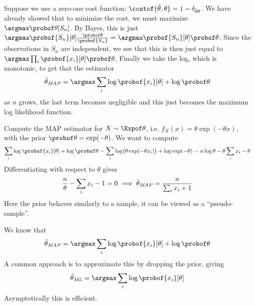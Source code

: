 \eexam

\bexam[title=Maximum Aposteriori]

    Suppose we use a {\emphcolor zero-one} cost function: $\costof{\hat\theta,\theta}=1-\delta_{\hat\theta\theta}$.
    We have already showed that to minimize the cost, we must maximize $\argmax\probof\theta[S_n]$.
    By Bayes, this is just $\argmax\probof{S_n}[\theta]\frac{\probof\theta}{\probof{S_n}}=\argmax\probof{S_n}[\theta]\probof\theta$.
    Since the observations in $S_n$ are independent, we see that this is then just equal to $\argmax\prod_i\probof{x_i}[\theta]\probof\theta$.
    Finally we take the log, which is monotonic, to get that the estimator
    $$ \hat\theta_{\it MAP} = \argmax\sum_i\log\probof{x_i}[\theta] + \log\probof\theta $$
    as $n$ grows, the last term becomes negligible and this just becomes the maximum log likelihood function.

\eexam

\bexerc

    Compute the MAP estimator for $X\sim\Expof\theta$, i.e. $f_X(x)=\theta\exp(-\theta x)$, with the prior $\probof\theta=\exp(-\theta)$.
    We want to compute
    $$ \sum_i\log\probof{x_i}[\theta] + \log\probof\theta = \sum_i\log\bigl(\theta\exp(-\theta x_i)\bigr) + \log\exp(-\theta) = n\log\theta - \theta\sum_ix_i - \theta $$
    Differentiating with respect to $\theta$ gives
    $$ \frac n\theta - \sum_ix_i - 1 = 0 \implies \hat\theta_{\it MAP} = \frac n{\sum_ix_i + 1} $$
    Here the prior behaves similarly to a sample, it can be viewed as a ``pseudo-sample''.

\eexerc

\bexam[title=Maximum Likelihood]

    We know that
    $$ \hat\theta_{\it MAP} = \argmax\sum_i\log\probof{x_i}[\theta] + \log\probof\theta $$
    A common approach is to approximate this by dropping the prior, giving
    $$ \hat\theta_{\it ML} = \argmax\sum_i\log\probof{x_i}[\theta] $$
    Asymptotically this is efficient.

\eexam

